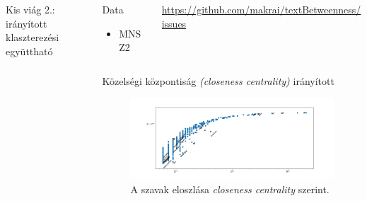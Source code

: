 \documentclass{beamer}
\newlength{\sepwid}
\newlength{\onecolwid}
\newlength{\twocolwid}
\begin{document}
\begin{frame}[t]
\begin{columns}[t]
\begin{column}{\onecolwid}
\begin{block}{Kis viág 2.: irányított klaszterezési együttható}
\begin{figure}
        \end{figure}
      \end{block}
    \end{column}

    \begin{column}{\sepwid} \end{column}			%


    \begin{column}{\twocolwid} %
      \begin{columns}
        \begin{column}{.5\columnwidth}
          \begin{block}{Data}
            \begin{itemize}
              \item
            MNSZ2 \citep{oravecz2014hungarian}
            \end{itemize}
          \end{block}
        \end{column}
        \begin{column}{.5\columnwidth}
          \url{https://github.com/makrai/textBetweenness/issues}
        \end{column}
      \end{columns}
      \begin{block}{Közelségi központiság \emph{(closeness centrality)}}
        irányított
        \begin{figure}[h]
          \begin{center}
            \includegraphics[width=\columnwidth]{current-flow-closeness.png}
                  \caption{A szavak eloszlása \emph{closeness centrality} szerint.}
          \end{center}
                \label{fig:closeness}
        \end{figure}
      \end{block}


\end{column}
\end{columns}
\end{frame}
\end{document}
